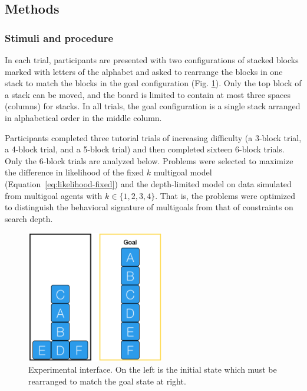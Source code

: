 \documentclass[10pt,letterpaper]{article}
\newcommand{\todo}[1]{\textcolor{red}{\textsc{[TODO: #1]}}}
\begin{document}




\subsection{Methods}
\subsubsection{Stimuli and procedure}

In each trial, participants are presented with two configurations of stacked blocks marked with letters of the alphabet and asked to rearrange the blocks in one stack to match the blocks in the goal configuration (Fig. \ref{fig:ui}). Only the top block of a stack can be moved, and the board is limited to contain at most three spaces (columns) for stacks. In all trials, the goal configuration is a single stack arranged in alphabetical order in the middle column.

Participants completed three tutorial trials of increasing difficulty (a 3-block trial, a 4-block trial, and a 5-block trial) and then completed sixteen 6-block trials. Only the 6-block trials are analyzed below. Problems were selected to maximize the difference in likelihood of the fixed $k$ multigoal model (Equation~\ref{eq:likelihood-fixed}) and the depth-limited model on data simulated from multigoal agents with $k \in \{ 1,2,3,4 \}$. That is, the problems were optimized to distinguish the behavioral signature of multigoals from that of constraints on search depth.

\begin{figure}[t!]
    \centering
    \includegraphics[width=6cm]{example-block-world.png}
    \caption{Experimental interface. On the left is the initial state which must be rearranged to match the goal state at right.}
    \label{fig:ui}
\end{figure}
\end{document}
